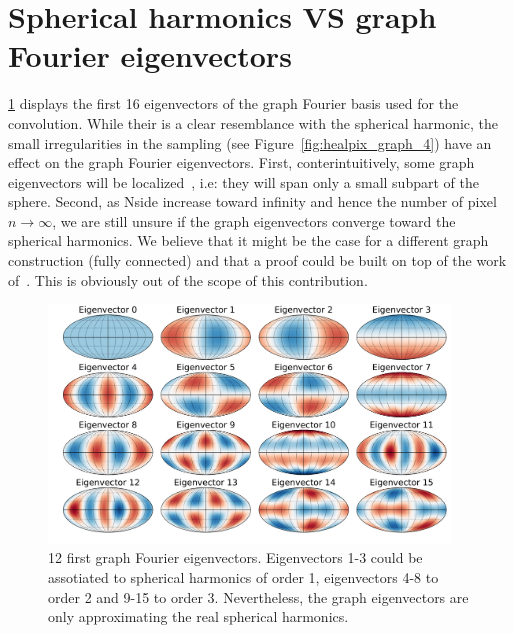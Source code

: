 \documentclass[final,twocolumn,3p,times,authoryear]{elsarticle}
\newcommand{\figref}[1]{Figure~\ref{fig:#1}}
\newcommand{\1}{\b{1}}              %
\newcommand{\0}{\b{0}}              %
\begin{document}
\appendix

\section{Spherical harmonics VS graph Fourier eigenvectors}
\ref{fig:graph_harmonics} displays the first 16 eigenvectors of the
graph Fourier basis used for the convolution. While their is a clear
resemblance with the spherical harmonic, the small irregularities in the
sampling (see \figref{healpix_graph_4}) have an effect on the
graph Fourier eigenvectors. First, conterintuitively, some graph eigenvectors will be
localized~\cite{perraudin2018global}, i.e: they will span only a small subpart
of the sphere.  Second, as Nside increase toward infinity and hence the number
of pixel $n\rightarrow \infty$, we are still unsure if the graph eigenvectors
converge toward the spherical harmonics. We believe that it might be the case
for a different graph construction (fully connected) and that a proof could be
built on top of the work of~\cite{belkin2007convergence}. This is obviously
out of the scope of this contribution.

\label{sec:spherical_harmonics}
\begin{figure}[!htb]
\centering
\includegraphics[width=0.95\textwidth]{figures/eigenvectors.pdf}
\caption{12 first graph Fourier eigenvectors. Eigenvectors 1-3 could be assotiated to spherical harmonics of order 1, eigenvectors 4-8 to order 2 and 9-15 to order 3. Nevertheless, the graph eigenvectors are only approximating the real spherical harmonics.}
\label{fig:graph_harmonics}
\end{figure}
\end{document}
